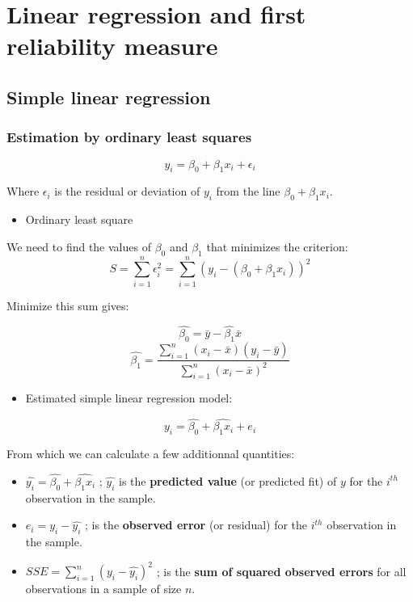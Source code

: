 \documentclass[
]{report}
\providecommand{\tightlist}{%
  \setlength{\itemsep}{0pt}\setlength{\parskip}{0pt}}
\begin{document}
\hypertarget{linear-regression-and-first-reliability-measure}{%
\chapter{Linear regression and first reliability measure}\label{linear-regression-and-first-reliability-measure}}

\hypertarget{simple-linear-regression}{%
\section{Simple linear regression}\label{simple-linear-regression}}

\hypertarget{estimation-by-ordinary-least-squares}{%
\subsection{Estimation by ordinary least squares}\label{estimation-by-ordinary-least-squares}}

\[y_i = \beta_0 + \beta_1x_i +  \epsilon_i\]

Where \(\epsilon_i\) is the residual or deviation of \(y_i\) from the line \(\beta_0 + \beta_1x_i\).

\begin{itemize}
\tightlist
\item
  Ordinary least square
\end{itemize}

We need to find the values of \(\beta_0\) and \(\beta_1\) that minimizes the criterion:
\[S = \sum_{i=1}^n \epsilon_i^2 = \sum_{i=1}^n (y_i - (\beta_0 + \beta_1x_i))^2\]

Minimize this sum gives:

\[\hat{\beta_0}= \bar{y} - \hat{\beta_1}\bar{x}\]
\[\hat{\beta_1}= \frac{\sum_{i=1}^n(x_i -\bar{x})(y_i -\bar{y})}{\sum_{i=1}^n(x_i -\bar{x})^2}\]

\begin{itemize}
\tightlist
\item
  Estimated simple linear regression model:
\end{itemize}

\[y_i = \hat{\beta_0} + \hat{\beta_1x_i} +  e_i\]

From which we can calculate a few additionnal quantities:

\begin{itemize}
\item
  \(\hat{y_i} = \hat{\beta_0} + \hat{\beta_1x_i}\) ; \(\hat{y_i}\) is the \textbf{predicted value} (or predicted fit) of \(y\) for the \(i^{th}\) observation in the sample.
\item
  \(e_i=y_i -\hat{y_i}\) ; is the \textbf{observed error} (or residual) for the \(i^{th}\) observation in the sample.
\item
  \(SSE = \sum_{i=1}^n (y_i -\hat{y_i})^2\) ; is the \textbf{sum of squared observed errors} for all observations in a sample of size \(n\).
\end{itemize}
\end{document}
